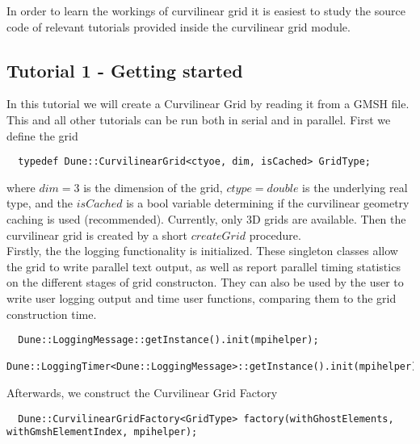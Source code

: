 \noindent
In order to learn the workings of curvilinear grid it is easiest to study the source code of relevant tutorials  provided inside the curvilinear grid module.

\subsection{Tutorial 1 - Getting started}
\label{usage-howto-tutorial-gettingstarted}

\noindent
In this tutorial we will create a Curvilinear Grid by reading it from a GMSH file. This and all other tutorials can be run both in serial and in parallel. First we define the grid \\

\begin{mybox}
\begin{lstlisting}
  typedef Dune::CurvilinearGrid<ctyoe, dim, isCached> GridType;
\end{lstlisting}
\end{mybox}

\noindent
where $dim=3$ is the dimension of the grid, $ctype=double$ is the underlying real type, and the $isCached$ is a bool variable determining if the curvilinear geometry caching is used (recommended). Currently, only 3D grids are available. Then the curvilinear grid is created by a short $createGrid$ procedure.  \\

\noindent
Firstly, the the logging functionality is initialized. These singleton classes allow the grid to write parallel text output, as well as report parallel timing statistics on the different stages of grid constructon. They can also be used by the user to write user logging output and time user functions, comparing them to the grid construction time. \\

\begin{mybox}
\begin{lstlisting}
  Dune::LoggingMessage::getInstance().init(mpihelper);
  Dune::LoggingTimer<Dune::LoggingMessage>::getInstance().init(mpihelper);
\end{lstlisting}
\end{mybox}

\noindent
Afterwards, we construct the Curvilinear Grid Factory \\

\begin{mybox}
\begin{lstlisting}
  Dune::CurvilinearGridFactory<GridType> factory(withGhostElements, withGmshElementIndex, mpihelper);
\end{lstlisting}
\end{mybox}

